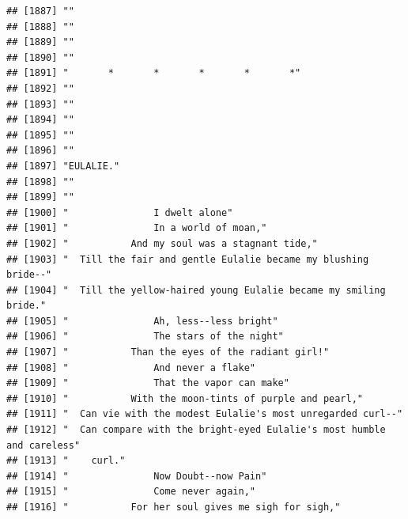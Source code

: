 \documentclass{article}\usepackage[]{graphicx}\usepackage[]{color}
\makeatletter
\newenvironment{kframe}{%
 \def\at@end@of@kframe{}%
 \ifinner\ifhmode%
  \def\at@end@of@kframe{\end{minipage}}%
  \begin{minipage}{\columnwidth}%
 \fi\fi%
 \def\FrameCommand##1{\hskip\@totalleftmargin \hskip-\fboxsep
 \colorbox{shadecolor}{##1}\hskip-\fboxsep
     \hskip-\linewidth \hskip-\@totalleftmargin \hskip\columnwidth}%
 \MakeFramed {\advance\hsize-\width
   \@totalleftmargin\z@ \linewidth\hsize
   \@setminipage}}%
 {\par\unskip\endMakeFramed%
 \at@end@of@kframe}
\newenvironment{knitrout}{}{} %
\makeatother
\begin{document}
\begin{knitrout}
\begin{kframe}
\begin{verbatim}
## [1887] ""                                                                            
## [1888] ""                                                                            
## [1889] ""                                                                            
## [1890] ""                                                                            
## [1891] "       *       *       *       *       *"                                    
## [1892] ""                                                                            
## [1893] ""                                                                            
## [1894] ""                                                                            
## [1895] ""                                                                            
## [1896] ""                                                                            
## [1897] "EULALIE."                                                                    
## [1898] ""                                                                            
## [1899] ""                                                                            
## [1900] "               I dwelt alone"                                                
## [1901] "               In a world of moan,"                                          
## [1902] "           And my soul was a stagnant tide,"                                 
## [1903] "  Till the fair and gentle Eulalie became my blushing bride--"               
## [1904] "  Till the yellow-haired young Eulalie became my smiling bride."             
## [1905] "               Ah, less--less bright"                                        
## [1906] "               The stars of the night"                                       
## [1907] "           Than the eyes of the radiant girl!"                               
## [1908] "               And never a flake"                                            
## [1909] "               That the vapor can make"                                      
## [1910] "           With the moon-tints of purple and pearl,"                         
## [1911] "  Can vie with the modest Eulalie's most unregarded curl--"                  
## [1912] "  Can compare with the bright-eyed Eulalie's most humble and careless"       
## [1913] "    curl."                                                                   
## [1914] "               Now Doubt--now Pain"                                          
## [1915] "               Come never again,"                                            
## [1916] "           For her soul gives me sigh for sigh,"                             

\end{verbatim}
\end{kframe}
\end{knitrout}
\end{document}
